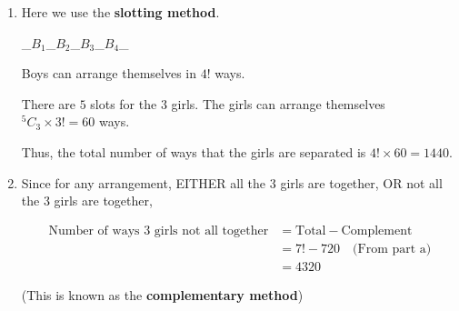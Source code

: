\documentclass[11pt,a4paper]{book}
\begin{document}
\begin{example}
\begin{enumerate}[label=(\alph*)]
\item  Here we use the \textbf{slotting method}.

\_$B_{1}$\_$B_{2}$\_$B_{3}$\_$B_{4}$\_

Boys can arrange themselves in $4!$ ways.

There are $5$ slots for the $3$ girls. The girls can arrange themselves
$^{5}C_{3}\times3!=60$ ways.

Thus, the total number of ways that the girls are separated is $4!\times60=1440$.

\item  Since for any arrangement, EITHER all the 3 girls are together,
OR not all the 3 girls are together,

\begin{align*}
\text{Number of ways 3 girls not all together} & =\text{Total}-\text{Complement}\\
 & =7!-720\quad\text{(From part a)}\\
 & =4320
\end{align*}

(This is known as the \textbf{complementary method})

\end{enumerate}

\end{example}

\newpage
\end{document}
